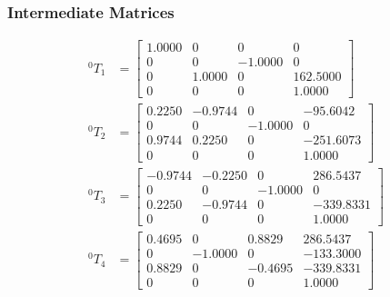 \documentclass[12pt]{article}
\begin{document}
\subsubsection{Intermediate Matrices}
\begin{equation*}
    \begin{split}
        ^{0}T_{1} & = \begin{bmatrix}
                          1.0000 & 0      & 0       & 0        \\
                          0      & 0      & -1.0000 & 0        \\
                          0      & 1.0000 & 0       & 162.5000 \\
                          0      & 0      & 0       & 1.0000
                      \end{bmatrix}    \\
        ^{0}T_{2} & = \begin{bmatrix}
                          0.2250 & -0.9744 & 0       & -95.6042  \\
                          0      & 0       & -1.0000 & 0         \\
                          0.9744 & 0.2250  & 0       & -251.6073 \\
                          0      & 0       & 0       & 1.0000
                      \end{bmatrix}  \\
        ^{0}T_{3} & = \begin{bmatrix}
                          -0.9744 & -0.2250 & 0       & 286.5437  \\
                          0       & 0       & -1.0000 & 0         \\
                          0.2250  & -0.9744 & 0       & -339.8331 \\
                          0       & 0       & 0       & 1.0000
                      \end{bmatrix} \\
        ^{0}T_{4} & = \begin{bmatrix}
                          0.4695 & 0       & 0.8829  & 286.5437  \\
                          0      & -1.0000 & 0       & -133.3000 \\
                          0.8829 & 0       & -0.4695 & -339.8331 \\
                          0      & 0       & 0       & 1.0000
                      \end{bmatrix}  \\

\end{split}
\end{equation*}
\end{document}
